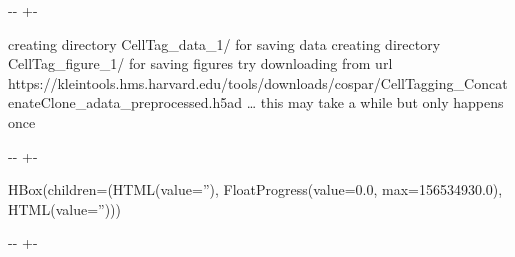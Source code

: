 \documentclass[letterpaper,10pt,english]{sphinxmanual}
\newlength\nbsphinxcodecellspacing
\begin{document}
{

\kern-\sphinxverbatimsmallskipamount\kern-\baselineskip
\kern+\FrameHeightAdjust\kern-\fboxrule
\vspace{\nbsphinxcodecellspacing}

\begin{sphinxVerbatim}[commandchars=\\\{\}]
creating directory CellTag\_data\_1/ for saving data
creating directory CellTag\_figure\_1/ for saving figures
try downloading from url
https://kleintools.hms.harvard.edu/tools/downloads/cospar/CellTagging\_ConcatenateClone\_adata\_preprocessed.h5ad
{\ldots} this may take a while but only happens once
\end{sphinxVerbatim}
}

{

\kern-\sphinxverbatimsmallskipamount\kern-\baselineskip
\kern+\FrameHeightAdjust\kern-\fboxrule
\vspace{\nbsphinxcodecellspacing}

\begin{sphinxVerbatim}[commandchars=\\\{\}]
HBox(children=(HTML(value=''), FloatProgress(value=0.0, max=156534930.0), HTML(value='')))
\end{sphinxVerbatim}
}

{

\kern-\sphinxverbatimsmallskipamount\kern-\baselineskip
\kern+\FrameHeightAdjust\kern-\fboxrule
\vspace{\nbsphinxcodecellspacing}

\begin{sphinxVerbatim}[commandchars=\\\{\}]

\end{sphinxVerbatim}
}

{
\begin{sphinxVerbatim}[commandchars=\\\{\}]
\llap{\color{nbsphinxin}[4]:\,\hspace{\fboxrule}\hspace{\fboxsep}}
\end{sphinxVerbatim}
}
\end{document}
